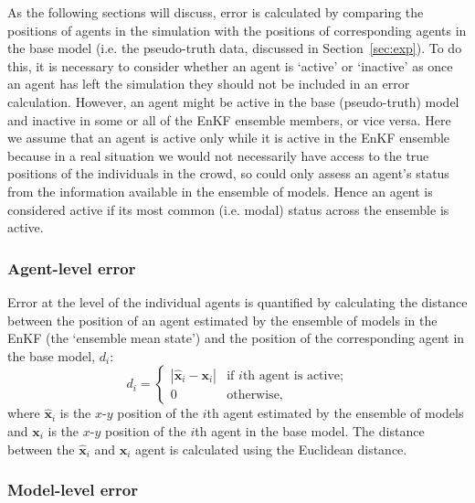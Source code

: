 \documentclass{article}
\begin{document}
As the following sections will discuss, error is calculated by comparing the positions of agents in the simulation with the positions of corresponding agents in the base model (i.e. the pseudo-truth data, discussed in Section~\ref{sec:exp}). To do this, it is necessary to consider whether an agent is `active' 
or `inactive' as once an agent has left the simulation they should not be included in an error calculation. However, an agent might be active in the base (pseudo-truth) model and inactive in some or all of the EnKF ensemble members, or vice versa.  
Here we assume that an agent is active only while it is active in the EnKF ensemble  because in a real situation we would not necessarily have access to the true positions of the individuals in the crowd, so could only assess an agent's status from the information available in the ensemble of models. Hence an agent is considered active if its most common (i.e. modal) status across the ensemble is active.

\subsubsection{Agent-level error}

Error at the level of the individual agents is quantified by calculating the distance between the position of an agent estimated by the ensemble of models in the EnKF (the `ensemble mean state') and the position of the corresponding agent in the base model, $d_i$:
\begin{equation}
    d_i = 
    \begin{cases}
        | \hat{\mathbf{x}}_i - \mathbf{x}_i | & \text{if $i$th agent is
        active;}\\
        0 & \text{otherwise,}
    \end{cases}
    \label{eq:agent_level_error1}
\end{equation}
where $\hat{\mathbf{x}}_i$ is the $x$-$y$ position of the $i$th agent estimated by the ensemble of models and $\mathbf{x}_i$ is the $x$-$y$ position of the $i$th agent in the base model. The distance between the $\hat{\mathbf{x}}_i$ and $\mathbf{x}_i$ agent is calculated using the Euclidean distance.

\subsubsection{Model-level error}
\end{document}
